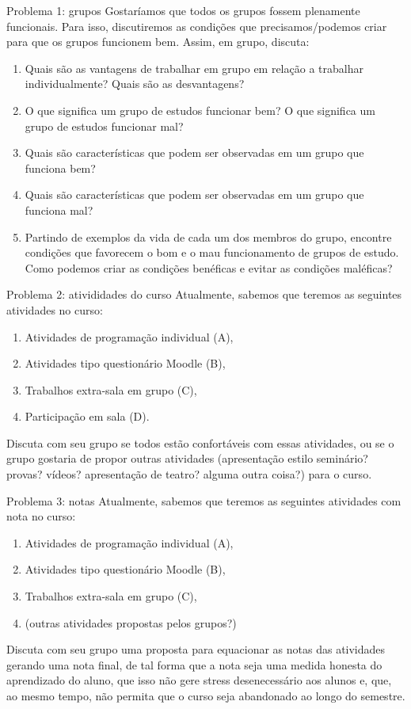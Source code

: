 \documentclass{beamer}
\begin{document}
\begin{frame}{Problema 1: grupos}
\large
Gostaríamos que todos os grupos fossem plenamente funcionais. Para isso, discutiremos as condições que precisamos/podemos criar para que os grupos funcionem bem. Assim, em grupo, discuta:
\begin{enumerate}
\item Quais são as vantagens de trabalhar em grupo em relação a trabalhar individualmente? Quais são as desvantagens?
\item O que significa um grupo de estudos funcionar bem? O que significa um grupo de estudos funcionar mal?
\item<2-> Quais são características que podem ser observadas em um grupo que funciona bem?
\item<2-> Quais são características que podem ser observadas em um grupo que funciona mal?
\item<3-> Partindo de exemplos da vida de cada um dos membros do grupo, encontre condições que favorecem o bom e o mau funcionamento de grupos de estudo. Como podemos criar as condições benéficas e evitar as condições maléficas?
\end{enumerate}
\end{frame}

\begin{frame}{Problema 2: ativididades do curso}
\large
Atualmente, sabemos que teremos as seguintes atividades no curso:
\begin{enumerate}
\item Atividades de programação individual (A),
\item Atividades tipo questionário Moodle (B),
\item Trabalhos extra-sala em grupo (C),
\item Participação em sala (D).
\end{enumerate}

Discuta com seu grupo se todos estão confortáveis com essas atividades, ou se o grupo gostaria de propor outras atividades (apresentação estilo seminário? provas? vídeos? apresentação de teatro? alguma outra coisa?) para o curso.
\end{frame}

\begin{frame}{Problema 3: notas}
\large
Atualmente, sabemos que teremos as seguintes atividades com nota no curso:
\begin{enumerate}
\item Atividades de programação individual (A),
\item Atividades tipo questionário Moodle (B),
\item Trabalhos extra-sala em grupo (C),
\item (outras atividades propostas pelos grupos?)
\end{enumerate}
Discuta com seu grupo uma proposta para equacionar as notas das atividades gerando uma nota final, de tal forma que a nota seja uma medida honesta do aprendizado do aluno, que isso não gere stress desenecessário aos alunos e, que, ao mesmo tempo, não permita que o curso seja abandonado ao longo do semestre.
\end{frame}
\end{document}
